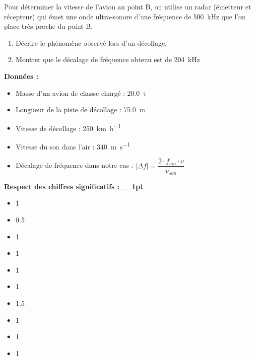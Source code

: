 \documentclass[a4paper,11pt,fleqn]{article}%
\begin{document}
\begin{minipage}[t]{.9\linewidth}
Pour déterminer la vitesse de l'avion au point B, on utilise un radar (émetteur et récepteur) qui émet une onde ultra-sonore d'une fréquence de \SI{500}{kHz} que l'on place très proche du point B.
\begin{enumerate}[resume]
	\item Décrire le phénomène observé lors d'un décollage.
	\item Montrer que le décalage de fréquence obtenu est de \SI{204}{kHz}
\end{enumerate}
\textbf{Données : }
\begin{itemize}
	\item Masse d’un avion de chasse chargé : \SI{20.0}{t}
	\item Longueur de la piste de décollage : \SI{75.0}{m}
	\item Vitesse de décollage : \SI{250}{\kilo\meter\per\hour}
	\item Vitesse du son dans l'air : \SI{340}{\meter\per\second}
	\item Décalage de fréquence dans notre cas : $|\Delta f| = \dfrac{2\cdot f_{em} \cdot v}{v_{son}}$
\end{itemize}
\textbf{Respect des chiffres significatifs : $\_\_\_$ 1pt}
\end{minipage}
\begin{minipage}[t]{.1\linewidth}
\vspace{10.5em}
\begin{itemize}[label=$\_\_\_$]%
	\item 1 \vspace{4em}
	\item 0.5
	\item 1
	\item 1
	\item 1
\end{itemize}
\vspace{2em} 
\begin{itemize}[label=$\_\_\_$]%
	\item 1
	\item 1.5\\
	\item 1
\end{itemize}
\vspace{2em} 
\begin{itemize}[label=$\_\_\_$]%
	\item 1
	\item 1
\end{itemize}
\end{minipage}
\end{document}
